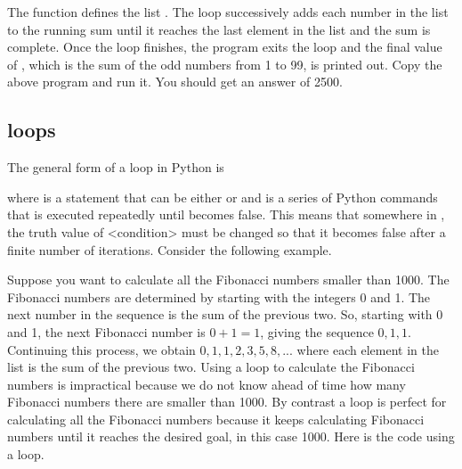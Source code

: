 \documentclass[letterpaper,10pt,english]{sphinxmanual}
\begin{document}
\sphinxAtStartPar
The  function defines the list \sphinxcode{\sphinxupquote{{[}1, 3, 5, ..., 97, 99{]}}}.  The  loop successively adds each number in the list to the running sum until it reaches the last element in the list and the sum is complete.  Once the  loop finishes, the program exits the loop and the final value of , which is the sum of the odd numbers from 1 to 99, is printed out.  Copy the above program and run it.  You should get an answer of 2500.

\ignorespaces 

\subsection{ loops}
\label{\detokenize{chap6/chap6_loopsconds:while-loops}}\label{\detokenize{chap6/chap6_loopsconds:index-4}}
\sphinxAtStartPar
The general form of a  loop in Python is

\begin{sphinxVerbatim}[commandchars=\\\{\}]
 
\end{sphinxVerbatim}

\sphinxAtStartPar
where  is a statement that can be either  or  and  is a series of Python commands that is executed repeatedly until  becomes false.  This means that somewhere in , the truth value of \textless{}condition\textgreater{} must be changed so that it becomes false after a finite number of iterations.  Consider the following example.

\sphinxAtStartPar
Suppose you want to calculate all the Fibonacci numbers smaller than 1000.  The Fibonacci numbers are determined by starting with the integers 0 and 1.  The next number in the sequence is the sum of the previous two.  So, starting with 0 and 1, the next Fibonacci number is \(0+1=1\), giving the sequence \(0, 1, 1\).  Continuing this process, we obtain \(0, 1, 1, 2, 3, 5, 8, ...\) where each element in the list is the sum of the previous two.   Using a  loop to calculate the Fibonacci numbers is impractical because we do not know ahead of time how many Fibonacci numbers there are smaller than 1000.  By contrast a  loop is perfect for calculating all the Fibonacci numbers because it keeps calculating Fibonacci numbers until it reaches the desired goal, in this case 1000.  Here is the code using a  loop.
\end{document}
